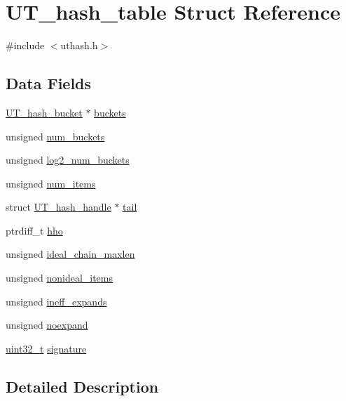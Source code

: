 \hypertarget{struct_u_t__hash__table}{}\section{U\+T\+\_\+hash\+\_\+table Struct Reference}
\label{struct_u_t__hash__table}


{\ttfamily \#include $<$uthash.\+h$>$}

\subsection*{Data Fields}
\begin{DoxyCompactItemize}
\item 
\hyperlink{struct_u_t__hash__bucket}{U\+T\+\_\+hash\+\_\+bucket} $\ast$ \hyperlink{struct_u_t__hash__table_ab8166e712e5eff3106991bec13d9ab20}{buckets}
\item 
unsigned \hyperlink{struct_u_t__hash__table_a5f0f25a07827aacb7af4ba2fc4afb5fe}{num\+\_\+buckets}
\item 
unsigned \hyperlink{struct_u_t__hash__table_a1e4983525460bc9180bbb5e7b404cdbb}{log2\+\_\+num\+\_\+buckets}
\item 
unsigned \hyperlink{struct_u_t__hash__table_a0f665ec9c648f93c0c529372051e79e7}{num\+\_\+items}
\item 
struct \hyperlink{struct_u_t__hash__handle}{U\+T\+\_\+hash\+\_\+handle} $\ast$ \hyperlink{struct_u_t__hash__table_af2d4a4fd9335f9813df1ecd3d7124f24}{tail}
\item 
ptrdiff\+\_\+t \hyperlink{struct_u_t__hash__table_af7a888099092eb93f240f1b2bfcc2708}{hho}
\item 
unsigned \hyperlink{struct_u_t__hash__table_a0eed5348057e127cdc2fe87bc635a7ac}{ideal\+\_\+chain\+\_\+maxlen}
\item 
unsigned \hyperlink{struct_u_t__hash__table_a57d93a760aeccec5dad6fac71e9d92ad}{nonideal\+\_\+items}
\item 
unsigned \hyperlink{struct_u_t__hash__table_ad2dea912f78ea416489b0a386ad0daf9}{ineff\+\_\+expands}
\item 
unsigned \hyperlink{struct_u_t__hash__table_a35073018f3ebb189c76eed44ff19899a}{noexpand}
\item 
\hyperlink{uthash_8h_a435d1572bf3f880d55459d9805097f62}{uint32\+\_\+t} \hyperlink{struct_u_t__hash__table_acd2a6284879dded65f0b8daa7c68485a}{signature}
\end{DoxyCompactItemize}


\subsection{Detailed Description}


